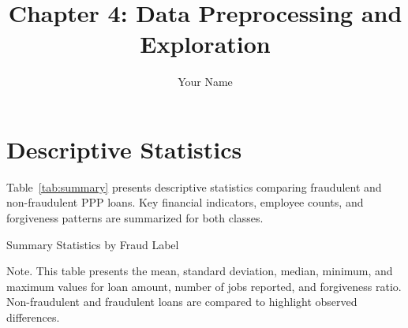 \documentclass[man]{apa7}
\title{Chapter 4: Data Preprocessing and Exploration}
\author{Your Name}
\affiliation{Your University}
\begin{document}
\maketitle

\section{Descriptive Statistics}

Table~\ref{tab:summary} presents descriptive statistics comparing fraudulent and non-fraudulent PPP loans. Key financial indicators, employee counts, and forgiveness patterns are summarized for both classes.

\begin{table}[ht]
\centering

\caption{Summary Statistics by Fraud Label}
\caption*{\small Note. This table presents the mean, standard deviation, median, minimum, and maximum values for loan amount, number of jobs reported, and forgiveness ratio. Non-fraudulent and fraudulent loans are compared to highlight observed differences.}
\label{tab:summary}
\end{table}
\end{document}
